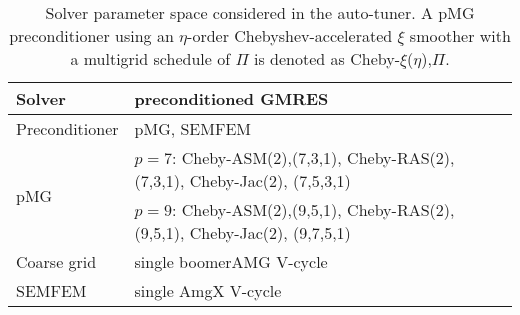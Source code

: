 \begin{table*}[h]
\begin{tabular}{|l | l|}
\hline
Solver & preconditioned GMRES\\
\hline
Preconditioner & pMG, SEMFEM \\
\multirow{2}{*}{\hspace*{.15in} pMG} & $p=7$: Cheby-ASM(2),(7,3,1), Cheby-RAS(2), (7,3,1), Cheby-Jac(2), (7,5,3,1)\\
                                     & $p=9$: Cheby-ASM(2),(9,5,1), Cheby-RAS(2), (9,5,1), Cheby-Jac(2), (9,7,5,1)\\
\hspace*{0.3in} Coarse grid & single boomerAMG V-cycle\\
\hspace*{.15in} SEMFEM & single AmgX V-cycle\\
\hline
\end{tabular}

\vspace{-0.25cm}
\caption{
  \small
  Solver parameter space considered in the auto-tuner.
  A pMG preconditioner using an $\eta$-order Chebyshev-accelerated $\xi$ smoother with
  a multigrid schedule of $\Pi$ is denoted as Cheby-$\xi$($\eta$),$\Pi$.
  \label{table:auto-tuner-parameter-space}
}
\end{table*}